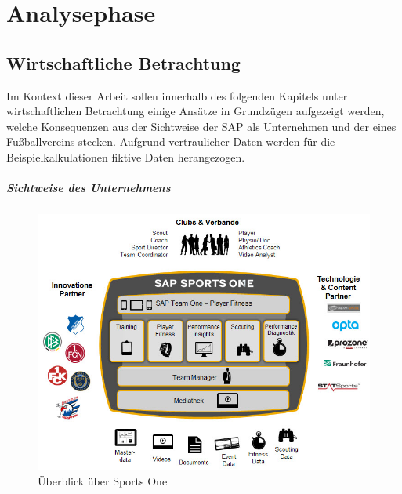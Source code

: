 \chapter{Analysephase}




\section{Wirtschaftliche Betrachtung}
Im Kontext dieser Arbeit sollen innerhalb des folgenden Kapitels unter wirtschaftlichen Betrachtung einige Ansätze in Grundzügen aufgezeigt werden, welche Konsequenzen aus der Sichtweise der SAP als Unternehmen und der eines Fußballvereins stecken.\enlargethispage{2\baselineskip}  Aufgrund vertraulicher Daten werden für die Beispielkalkulationen fiktive Daten herangezogen.

\paragraph{Sichtweise des Unternehmens}

\begin{figure}[H]
\centering
\includegraphics[scale=0.575]{se-wa-jpg/sportsone}
\caption{Überblick über Sports One}
\label{sportsone}
\end{figure}

